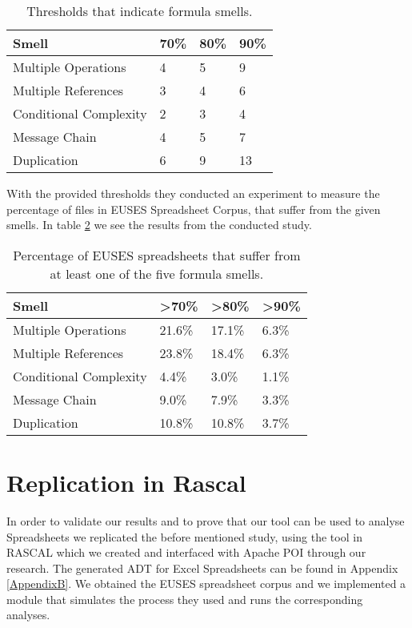 \begin{table}
\centering
    \begin{tabular}{llll}
    \hline
    Smell                  & 70\% & 80\% & 90\% \\\hline
    Multiple Operations    & 4   & 5   & 9   \\
    Multiple References    & 3   & 4   & 6   \\
    Conditional Complexity & 2   & 3   & 4   \\
    Message Chain          & 4   & 5   & 7   \\
    Duplication            & 6   & 9   & 13  \\
    \end{tabular}
    \caption{Thresholds that indicate formula smells\cite{feliene1}.}\label{tab:thres}
\end{table}

With the provided thresholds they conducted an experiment to measure the percentage of files in EUSES Spreadsheet Corpus, that suffer from the given smells. In table \ref{tab:eusesRes} we see the results from the conducted study.

\begin{table}
\centering
    \begin{tabular}{llll}
    \hline
    Smell                  & >70\%  & >80\%  & >90\% \\\hline
    Multiple Operations    & 21.6\% & 17.1\% & 6.3\% \\ 
    Multiple References    & 23.8\% & 18.4\% & 6.3\% \\
    Conditional Complexity & 4.4\%  & 3.0\%  & 1.1\% \\
    Message Chain          & 9.0\%  & 7.9\%  & 3.3\% \\
    Duplication            & 10.8\% & 10.8\% & 3.7\% \\
    \end{tabular}
    \caption{Percentage of EUSES spreadsheets that suffer from at least one of the five formula smells\cite{feliene1}.}\label{tab:eusesRes}
\end{table}

\section{Replication in Rascal}
In order to validate our results and to prove that our tool can be used to analyse Spreadsheets we replicated the before mentioned study, using the tool in RASCAL which we created and interfaced with Apache POI through our research. The generated ADT for Excel Spreadsheets can be found in Appendix \ref{AppendixB}.  We obtained the EUSES spreadsheet corpus and we implemented a module that simulates the process they used and runs the corresponding analyses.  

